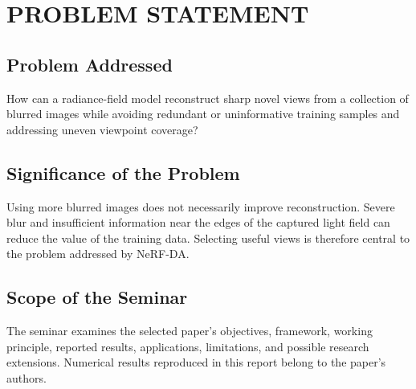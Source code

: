 \chapter{\MakeUppercase{Problem Statement}}
\setcounter{equation}{0}

\section{Problem Addressed}
How can a radiance-field model reconstruct sharp novel views from a collection of blurred images while avoiding redundant or uninformative training samples and addressing uneven viewpoint coverage?\cite{bib1}
\section{Significance of the Problem}
Using more blurred images does not necessarily improve reconstruction. Severe blur and insufficient information near the edges of the captured light field can reduce the value of the training data. Selecting useful views is therefore central to the problem addressed by NeRF-DA.
\section{Scope of the Seminar}
The seminar examines the selected paper's objectives, framework, working principle, reported results, applications, limitations, and possible research extensions. Numerical results reproduced in this report belong to the paper's authors.
